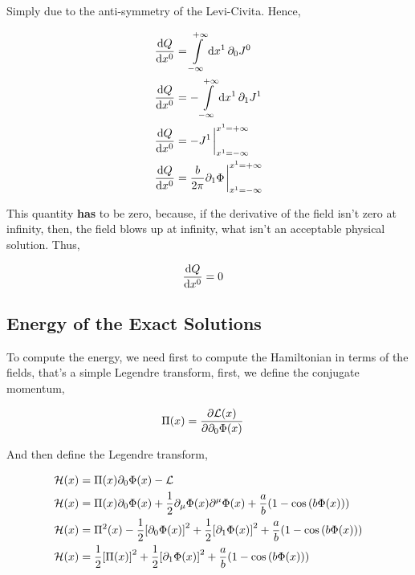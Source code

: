 Simply due to the anti-symmetry of the Levi-Civita. Hence,

\begin{align}
    \dv{Q}{x^0}&=\int\limits_{-\infty}^{+\infty}\dd{x^1}\partial_0J^0\nonumber\\
    \dv{Q}{x^0}&=-\int\limits_{-\infty}^{+\infty}\dd{x^1}\partial_1J^1\nonumber\\
    \dv{Q}{x^0}&=-J^1\eval_{x^1=-\infty}^{x^1=+\infty}\nonumber\\
    \dv{Q}{x^0}&=\frac{b}{2\pi}\partial_1\Phi\eval_{x^1=-\infty}^{x^1=+\infty}\nonumber
\end{align}

This quantity \textbf{has} to be zero, because, if the derivative of the field isn't zero at infinity, then, 
the field blows up at infinity, what isn't an acceptable physical solution. Thus,

\begin{align}
    \dv{Q}{x^0}&=0\nonumber
\end{align}


\subsection{Energy of the Exact Solutions}

To compute the energy, we need first to compute the Hamiltonian in terms of the fields, that's a simple Legendre 
transform, first, we define the conjugate momentum,

\begin{align}
    \Pi\qty(x)&=\pdv{\mathcal L\qty(x)}{\partial_0\Phi\qty(x)}\nonumber
\end{align}

And then define the Legendre transform,

\begin{align}
    \mathcal H\qty(x)&=\Pi\qty(x)\partial_0\Phi\qty(x)-\mathcal L\nonumber\\
    \mathcal H\qty(x)&=\Pi\qty(x)\partial_0\Phi\qty(x)
    +\frac12\partial_\mu\Phi\qty(x)\partial^\mu\Phi\qty(x)
    +\frac ab\qty(1-\cos\qty(b\Phi\qty(x)))\nonumber\\
    \mathcal H\qty(x)&=\Pi^2\qty(x)-\frac12\qty[\partial_0\Phi\qty(x)]^2
    +\frac12\qty[\partial_1\Phi\qty(x)]^2
    +\frac ab\qty(1-\cos\qty(b\Phi\qty(x)))\nonumber\\
    \mathcal H\qty(x)&=\frac12\qty[\Pi\qty(x)]^2
    +\frac12\qty[\partial_1\Phi\qty(x)]^2
    +\frac ab\qty(1-\cos\qty(b\Phi\qty(x)))\nonumber
\end{align}

